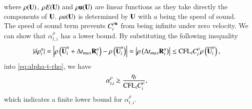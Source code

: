 where $\rho(\mathbf{U})$, $\rho E(\mathbf{U})$ and $\rho \mathbf{u}(\mathbf{U})$ are linear functions as they take directly the components of $\mathbf{U}$. $\rho a(\mathbf{U})$ is determined by $\mathbf{U}$ with $a$ being the speed of sound. 
The speed of sound term prevents $C_i^{\rho\mathbf{u}}$ from being infinite under zero velocity.
We can show that $\alpha_{t,i}^{\rho}$ has a lower bound.
By substituting the following inequality 
\begin{equation}
    |\delta \rho_i^n| = \left|\rho\left(\overline{\mathbf{U}}^n_i + \mathrm\Delta t_{max} \mathbf{R}^n_i\right) - \rho\left(\overline{\mathbf{U}}^n_i\right)\right|
    =
    \left|\rho\left(\mathrm\Delta t_{max} \mathbf{R}^n_i\right)\right|
    \leq
    \text{CFL}_i C^\rho_i \rho\left(\overline{\mathbf{U}}^n_i\right),
\end{equation}
into \eqref{eq:alpha-t-rho}, we have
\begin{equation}
    \label{eq:alpha-t-rho-lb}
    \alpha_{t,i}^{\rho} \geq \frac{\eta_t}{\text{CFL}_i C_i^\rho},
\end{equation}
which indicates a finite lower bound for $\alpha_{t,i}^{\rho}$. 

